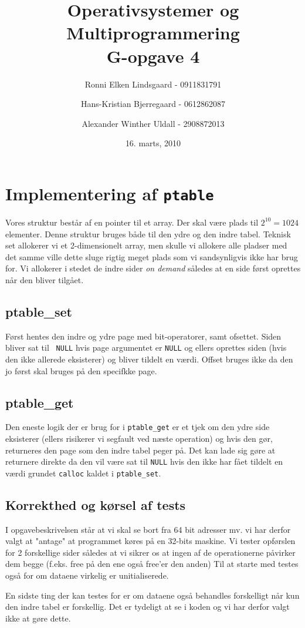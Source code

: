 \documentclass[titlepage]{article}
\title{Operativsystemer og Multiprogrammering\\G-opgave 4}
\author{Ronni Elken Lindsgaard - 0911831791 \and
Hans-Kristian Bjerregaard - 0612862087 \and
Alexander Winther Uldall - 2908872013}
\date{16. marts, 2010}
\begin{document}
\maketitle
\newpage
\section{Implementering af {\tt ptable}}
Vores struktur består af en pointer til et array. Der skal være plads til $2^{10} = 1024$
elementer. Denne struktur bruges både til den ydre og den indre tabel. Teknisk set allokerer vi et
2-dimensionelt array, men skulle vi allokere alle pladser med det samme ville dette sluge rigtig
meget plads som vi sandsynligvis ikke har brug for. Vi allokerer i stedet de indre sider {\it on
demand} således at en side først oprettes når den bliver tilgået. 

\subsection{ptable\_set}
Først hentes den indre og ydre page med bit-operatorer, samt ofsettet. Siden bliver sat til {\tt
NULL} hvis page argumentet er {\tt NULL} og ellers oprettes siden (hvis den ikke allerede
eksisterer) og bliver tildelt en værdi. Offset bruges ikke da den jo først skal bruges på den
specifkke page.
\subsection{ptable\_get}
Den eneste logik der er brug for i {\tt ptable\_get} er et tjek om den ydre side eksisterer (ellers
risikerer vi segfault ved næste operation) og hvis den gør, returneres den page som den indre tabel
peger på. Det kan lade sig gøre at returnere direkte da den vil være sat til {\tt NULL} hvis den
ikke har fået tildelt en værdi grundet {\tt calloc} kaldet i {\tt ptable\_set}.
\subsection{Korrekthed og kørsel af tests}
I opgavebeskrivelsen står at vi skal se bort fra 64 bit adresser mv. vi har derfor valgt at "antage"
at programmet køres på en 32-bits maskine.
Vi tester opførslen for 2 forskellige sider således at vi sikrer os at ingen af de operationerne
påvirker dem begge (f.eks. free på den ene også free'er den anden)
Til at starte med testes også for om dataene virkelig er unitialiserede.

En sidste ting der kan testes for er om dataene også behandles forskelligt når kun den indre tabel
er forskellig. Det er tydeligt at se i koden og vi har derfor valgt ikke at gøre dette.
\end{document}
